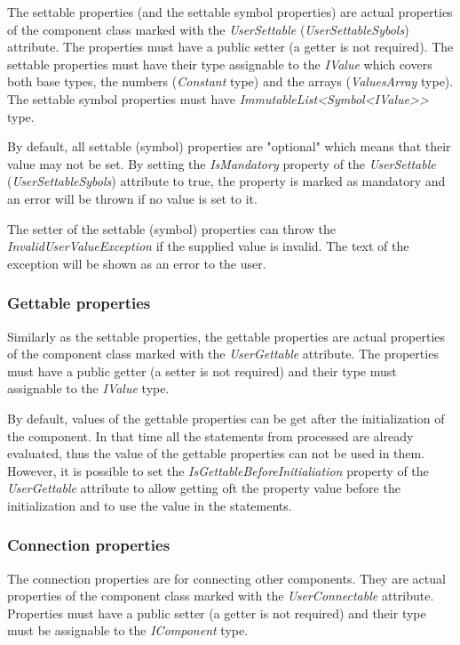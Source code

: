The settable properties (and the settable symbol properties) are actual properties of the component class marked with the \emph{UserSettable} (\emph{UserSettableSybols}) attribute.
The properties must have a public setter (a getter is not required).
The settable properties must have their type assignable to the \emph{IValue} which covers both base types, the numbers (\emph{Constant} type) and the arrays (\emph{ValuesArray} type).
The settable symbol properties must have \emph{ImmutableList<Symbol<IValue>{}>} type.

By default, all settable (symbol) properties are "optional" which means that their value may not be set.
By setting the \emph{IsMandatory} property of the \emph{UserSettable} (\emph{UserSettableSybols}) attribute to true, the property is marked as mandatory and an error will be thrown if no value is set to it.

The setter of the settable (symbol) properties can throw the \emph{InvalidUserValueException} if the supplied value is invalid.
The text of the exception will be shown as an error to the user.



\subsubsection{Gettable properties}

Similarly as the settable properties, the gettable properties are actual properties of the component class marked with the \emph{UserGettable} attribute.
The properties must have a public getter (a setter is not required) and their type must assignable to the \emph{IValue} type.

By default, values of the gettable properties can be get after the initialization of the component.
In that time all the statements from processed \lsystem are already evaluated, thus the value of the gettable properties can not be used in them.
However, it is possible to set the \emph{IsGettableBeforeInitialiation} property of the \emph{UserGettable} attribute to allow getting oft the property value before the initialization and to use the value in the \lsystem statements.


\subsubsection{Connection properties}

The connection properties are for connecting other components.
They are actual properties of the component class marked with the \emph{UserConnectable} attribute.
Properties must have a public setter (a getter is not required) and their type must be assignable to the \emph{IComponent} type.

